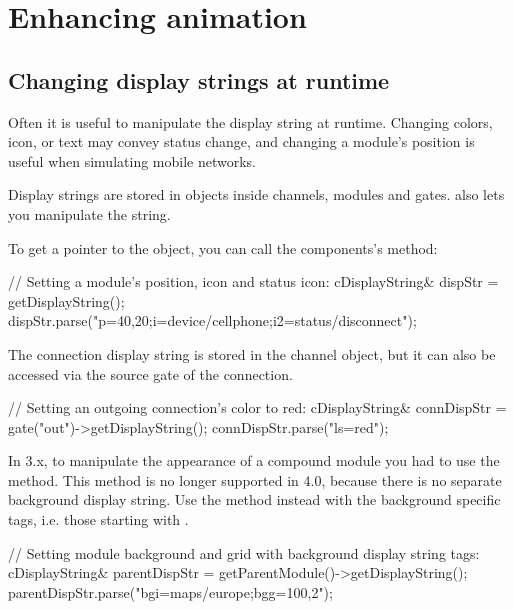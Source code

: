 \section{Enhancing animation}

\subsection{Changing display strings at runtime}

Often it is useful to manipulate the display string at runtime.
Changing colors, icon, or text may convey status change, and
changing a module's position is useful when simulating mobile
networks.

Display strings are stored in  objects inside
channels, modules and gates.  also lets you
manipulate the string.

To get a pointer to the  object, you can call
the components's  method:

\begin{cpp}
// Setting a module's position, icon and status icon:
cDisplayString& dispStr = getDisplayString();
dispStr.parse("p=40,20;i=device/cellphone;i2=status/disconnect");
\end{cpp}

\begin{note}
The connection display string is stored in the channel object, but it
can also be accessed via the source gate of the connection.
\end{note}

\begin{cpp}
// Setting an outgoing connection's color to red:
cDisplayString& connDispStr = gate("out")->getDisplayString();
connDispStr.parse("ls=red");
\end{cpp}

\begin{note}
In {\opp} 3.x, to manipulate the appearance of a compound module you had to use
the  method. This method is no longer
supported in {\opp} 4.0, because there is no separate background display string.
Use the  method instead with the background
specific tags, i.e. those starting with .
\end{note}

\begin{cpp}
// Setting module background and grid with background display string tags:
cDisplayString& parentDispStr = getParentModule()->getDisplayString();
parentDispStr.parse("bgi=maps/europe;bgg=100,2");
\end{cpp}

